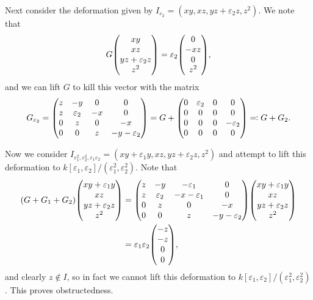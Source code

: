 \documentclass{amsart}
\theoremstyle{definition}
\theoremstyle{remark}
\theoremstyle{plain}
\theoremstyle{definition}
\theoremstyle{remark}
\newcommand{\ep}{\varepsilon}
\newcommand{\1}{\mathbf{1}}
\newcommand{\2}{\mathbf{2}}
\newcommand{\3}{\mathbf{3}}
\begin{document}
Next consider the deformation given by $I_{\ep_2} = (xy, xz, yz+\ep_2 z, z^2)$. We note that
\[ G \mqty(xy \\ xz \\ yz + \ep_2 z \\ z^2) = \ep_2 \mqty(0 \\ -xz \\ 0 \\ z^2), \]
and we can lift $G$ to kill this vector with the matrix
\[ G_{\ep_2} = \mqty(z & -y & 0 & 0 \\ z & \ep_2 & -x & 0 \\ 0 & z & 0 & -x \\ 0 & 0 & z & -y - \ep_2) = G + \mqty(0 & \ep_2 & 0 & 0 \\ 0 & 0 & 0 & 0 \\ 0 & 0 & 0 & -\ep_2 \\ 0 & 0 & 0 & 0) \eqqcolon G + G_2. \]

Now we consider $I_{\ep_1^2, \ep_2^2, \ep_1\ep_2} = (xy+\ep_1 y, xz, yz + \ep_2 z, z^2)$ and attempt to lift this deformation to $k[\ep_1, \ep_2]/(\ep_1^2, \ep_2^2)$. Note that 
\begin{align*} 
    (G + G_1 + G_2) \mqty(xy+\ep_1 y \\ xz \\ yz+\ep_2 z \\ z^2) &= \mqty(z & -y & -\ep_1 & 0 \\ z & \ep_2 & -x-\ep_1 & 0 \\ 0 & z & 0 & -x \\ 0 & 0 & z & -y - \ep_2) \mqty(xy+\ep_1 y \\ xz \\ yz+\ep_2 z \\ z^2) \\
    &= \ep_1 \ep_2 \mqty(-z \\ -z \\ 0 \\ 0),
\end{align*}
and clearly $z \notin I$, so in fact we cannot lift this deformation to $k[\ep_1, \ep_2]/(\ep_1^2, \ep_2^2)$. This proves obstructedness.
\end{document}
